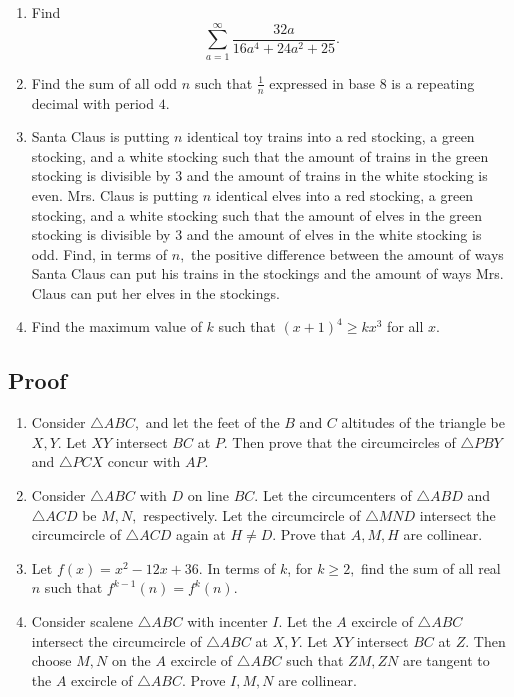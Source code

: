 \documentclass{lucky}
\begin{document}
\begin{enumerate}
\item Find \[\sum\limits_{a=1}^{\infty}\frac{32a}{16a^4+24a^2+25}.\]

\item Find the sum of all odd $n$ such that $\frac{1}{n}$ expressed in base $8$ is a repeating decimal with period $4.$

\item Santa Claus is putting $n$ identical toy trains into a red stocking, a green stocking, and a white stocking such that the amount of trains in the green stocking is divisible by $3$ and the amount of trains in the white stocking is even. Mrs. Claus is putting $n$ identical elves into a red stocking, a green stocking, and a white stocking such that the amount of elves in the green stocking is divisible by $3$ and the amount of elves in the white stocking is odd. Find, in terms of $n,$ the positive difference between the amount of ways Santa Claus can put his trains in the stockings and the amount of ways Mrs. Claus can put her elves in the stockings.

\item Find the maximum value of $k$ such that $(x+1)^4\geq kx^3$ for all $x.$

\end{enumerate}

\subsection{Proof}

\begin{enumerate}
    \item Consider $\triangle ABC,$ and let the feet of the $B$ and $C$ altitudes of the triangle be $X,Y.$ Let $XY$ intersect $BC$ at $P.$ Then prove that the circumcircles of $\triangle PBY$ and $\triangle PCX$ concur with $AP.$

    \item Consider $\triangle ABC$ with $D$ on line $BC.$ Let the circumcenters of $\triangle ABD$ and $\triangle ACD$ be $M,N,$ respectively. Let the circumcircle of $\triangle MND$ intersect the circumcircle of $\triangle ACD$ again at $H\neq D.$ Prove that $A,M,H$ are collinear.

    \item Let $f(x)=x^2-12x+36.$ In terms of $k$, for $k\geq 2,$ find the sum of all real $n$ such that $f^{k-1}(n)=f^k(n).$
    
    \item Consider scalene $\triangle ABC$ with incenter $I.$ Let the $A$ excircle of $\triangle ABC$ intersect the circumcircle of $\triangle ABC$ at $X,Y.$ Let $XY$ intersect $BC$ at $Z.$ Then choose $M,N$ on the $A$ excircle of $\triangle ABC$ such that $ZM,ZN$ are tangent to the $A$ excircle of $\triangle ABC.$ Prove $I,M,N$ are collinear.
\end{enumerate}
\end{document}
